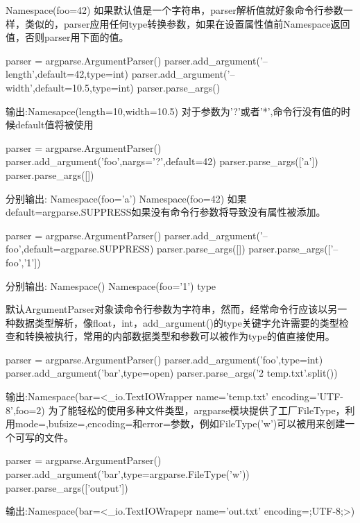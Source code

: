 Namespace(foo=42)\newline
如果默认值是一个字符串，parser解析值就好象命令行参数一样，类似的，parser应用任何type转换参数，如果在设置属性值前Namespace返回值，否则parser用下面的值。
\begin{python}
parser = argparse.ArgumentParser()
parser.add_argument('--length',default=42,type=int)
parser.add_argument('--width',default=10.5,type=int)
parser.parse_args()
\end{python}
输出:Namesapce(length=10,width=10.5)\newline
对于参数为'?'或者'*',命令行没有值的时候default值将被使用
\begin{python}
parser = argparse.ArgumentParser()
parser.add_argument('foo',nargs='?',default=42)
parser.parse_args(['a'])
parser.parse_args([])
\end{python}
分别输出:\newline
Namespace(foo='a')\newline
Namespace(foo=42)\newline
如果default=argparse.SUPPRESS如果没有命令行参数将导致没有属性被添加。
\begin{python}
parser = argparse.ArgumentParser()
parser.add_argument('--foo',default=argparse.SUPPRESS)
parser.parse_args([])
parser.parse_args(['--foo','1'])
\end{python}
分别输出:\newline
Namespace()\newline
Namespace(foo='1')\newline
type\par
默认ArgumentParser对象读命令行参数为字符串，然而，经常命令行应该以另一种数据类型解析，像float，int，add\_argument()的type关键字允许需要的类型检查和转换被执行，常用的内部数据类型和参数可以被作为type的值直接使用。
\begin{python}
parser = argparse.ArgumentParser()
parser.add_argument('foo',type=int)
parser.add_argument('bar',type=open)
parser.parse_args('2 temp.txt'.split())
\end{python}
输出:Namespace(bar=<\_io.TextIOWrapper name='temp.txt' encoding='UTF-8',foo=2)
为了能轻松的使用多种文件类型，argparse模块提供了工厂FileType，利用mode=,bufsize=,encoding=和error=参数，例如FileType('w')可以被用来创建一个可写的文件。
\begin{python}
parser = argparse.ArgumentParser()
parser.add_argument('bar',type=argparse.FileType('w'))
parser.parse_args(['output'])
\end{python}
输出:Namespace(bar=<\_io.TextIOWrapepr name='out.txt' encoding=;UTF-8;>)
